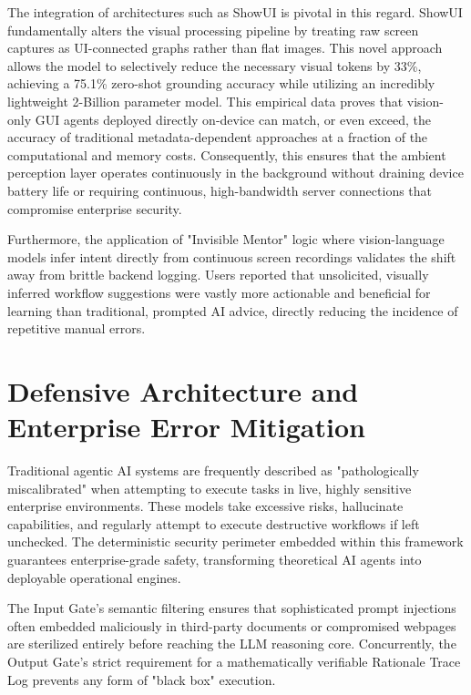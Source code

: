 \documentclass[12pt, a4paper]{report}
\begin{document}
The integration of architectures such as ShowUI is pivotal in this regard. ShowUI fundamentally alters the visual processing pipeline by treating raw screen captures as UI-connected graphs rather than flat images. This novel approach allows the model to selectively reduce the necessary visual tokens by 33\%, achieving a 75.1\% zero-shot grounding accuracy while utilizing an incredibly lightweight 2-Billion parameter model.\cite{hojo2025} This empirical data proves that vision-only GUI agents deployed directly on-device can match, or even exceed, the accuracy of traditional metadata-dependent approaches at a fraction of the computational and memory costs.\cite{hojo2025} Consequently, this ensures that the ambient perception layer operates continuously in the background without draining device battery life or requiring continuous, high-bandwidth server connections that compromise enterprise security.

Furthermore, the application of "Invisible Mentor" logic where vision-language models infer intent directly from continuous screen recordings validates the shift away from brittle backend logging. Users reported that unsolicited, visually inferred workflow suggestions were vastly more actionable and beneficial for learning than traditional, prompted AI advice, directly reducing the incidence of repetitive manual errors.\cite{hojo2025}

\section{Defensive Architecture and Enterprise Error Mitigation}
Traditional agentic AI systems are frequently described as "pathologically miscalibrated" when attempting to execute tasks in live, highly sensitive enterprise environments. These models take excessive risks, hallucinate capabilities, and regularly attempt to execute destructive workflows if left unchecked.\cite{redpilllabs2026} The deterministic security perimeter embedded within this framework guarantees enterprise-grade safety, transforming theoretical AI agents into deployable operational engines.\cite{redpilllabs2026}

The Input Gate's semantic filtering ensures that sophisticated prompt injections often embedded maliciously in third-party documents or compromised webpages are sterilized entirely before reaching the LLM reasoning core.\cite{hojo2025} Concurrently, the Output Gate's strict requirement for a mathematically verifiable Rationale Trace Log prevents any form of "black box" execution.\cite{hojo2025}
\end{document}
